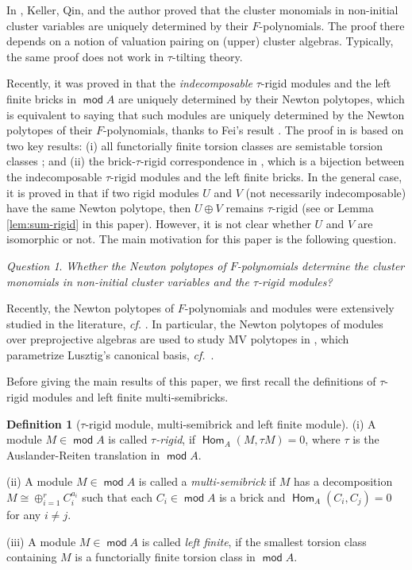 \documentclass[10pt]{amsart}
\theoremstyle{definition}
\newtheorem{definition}[theorem]{Definition}
\theoremstyle{remark}
\newtheorem{question}[theorem]{Question}
\numberwithin{equation}{section}
\def\mod{\opname{mod}\nolimits}
\newcommand{\opname}[1]{\operatorname{\mathsf{#1}}}
\newcommand{\Hom}{\opname{Hom}}
\newcommand{\confer}{\emph{cf.}\ }
\begin{document}
In \cite{ckq_2024}, Keller, Qin, and the author proved that the cluster monomials in non-initial cluster variables are uniquely determined by their $F$-polynomials. The proof there depends on a notion of valuation pairing on (upper) cluster algebras. Typically, the same proof does not work in $\tau$-tilting theory.

Recently, it was proved in \cite{cao-2025b} that the {\em indecomposable} $\tau$-rigid modules and the left finite bricks in $\mod A$ are uniquely determined by their Newton polytopes, which is equivalent to saying that such modules are uniquely determined by the Newton polytopes of their $F$-polynomials, thanks to Fei's result \cite{fei_2019a}. The proof in \cite{cao-2025b} is based on two key results: (i) all functorially finite torsion classes are semistable torsion classes \cite{asai-2021}; and (ii) the brick-$\tau$-rigid correspondence in \cite{DIJ-17}, which is a bijection between the indecomposable $\tau$-rigid modules and the left finite bricks. In the general case, it is proved in \cite{cao-2025b} that if two rigid modules $U$ and $V$ (not necessarily indecomposable) have the same Newton polytope, then $U\oplus V$ remains $\tau$-rigid (see \cite[Theorem 3.2]{cao-2025b}  or Lemma \ref{lem:sum-rigid} in this paper). However, it is not clear whether $U$ and $V$ are isomorphic or not. The main motivation for this paper is the following question.

\begin{question}
{\em Whether the Newton polytopes of $F$-polynomials determine the cluster monomials in non-initial cluster variables and the $\tau$-rigid modules?}
\end{question}

   Recently, the Newton polytopes of $F$-polynomials and modules were extensively studied in the literature, {\em cf.} \cite{BK-2012,BKT-2014,BCDMTY-2024, fei_2019a,fei_2019b,AHIKM-2022,Asai-Iyama-2020,li-pan-2022,cao-2025b}. In particular, the Newton polytopes of modules over preprojective algebras are used to study MV polytopes in \cite{BK-2012, BKT-2014}, which parametrize Lusztig’s canonical basis, \confer \cite{Kamnitzer-2010}. 


Before giving the main results of this paper, we first recall the definitions of $\tau$-rigid modules and left finite multi-semibricks.
\begin{definition}[$\tau$-rigid module, multi-semibrick and left finite module]
(i) A module $M\in\mod A$ is called {\em $\tau$-rigid}, if $\Hom_A(M,\tau M)=0$, where $\tau$ is the Auslander-Reiten translation in $\mod A$.

(ii) A module $M\in \mod A$ is called a {\em multi-semibrick} if
$M$ has a decomposition $M\cong \oplus_{i=1}^rC_i^{a_i}$ such that each $C_i\in\mod A$ is a brick and $\Hom_A(C_i,C_j)=0$ for any $i\neq j$.

(iii) A module $M\in\mod A$ is called {\em left finite}, if the smallest torsion class containing $M$ is a functorially finite torsion class in $\mod A$.
\end{definition}
\end{document}
